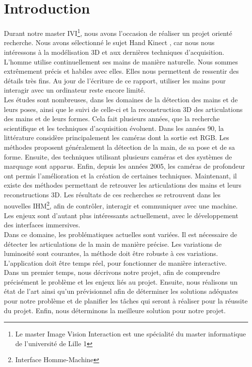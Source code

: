 \chapter*{Introduction}

Durant notre master IVI\footnote{Le master Image Vision Interaction est 
une spécialité du master informatique de l'université de Lille 1}, 
nous avons l'occasion de réaliser un projet orienté recherche. Nous avons 
sélectionné le sujet \og Hand Kinect \fg, car nous nous intéressons à la 
modélisation 3D et aux dernières techniques d'acquisition.\\

L'homme utilise continuellement ses mains de manière naturelle. Nous 
sommes extrêmement précis et habiles avec elles. Elles nous permettent 
de ressentir des détails très fins. Au jour de l'écriture de ce rapport, 
utiliser les mains pour interagir avec un ordinateur reste encore limité.\\

Les études sont nombreuses, dans les domaines de la détection des mains 
et de leurs poses, ainsi que le suivi de celle-ci et la reconstruction 
3D des articulations des mains et de leurs formes. Cela fait plusieurs 
années, que la recherche scientifique et les techniques d'acquisition 
évoluent. Dans les années 90, la littérature considère principalement les 
caméras dont la sortie est RGB. Les méthodes proposent généralement la 
détection de la main, de sa pose et de sa forme. Ensuite, des techniques 
utilisant plusieurs caméras et des systèmes de marquage sont apparus. 
Enfin, depuis les années 2005, les caméras de profondeur ont permis 
l'amélioration et la création de certaines techniques. Maintenant, il 
existe des méthodes permettant de retrouver les articulations des mains 
et leurs reconstructions 3D. Les résultats de ces recherches se 
retrouvent dans les nouvelles IHM\footnote{Interface Homme-Machine}, 
afin de contrôler, interagir et communiquer avec une machine. Les enjeux 
sont d'autant plus intéressants actuellement, avec le développement des 
interfaces immersives.\\

Dans ce domaine, les problématiques actuelles sont variées. Il est 
nécessaire de détecter les articulations de la main de manière précise. 
Les variations de luminosité sont courantes, la méthode doit être robuste 
à ces variations. L'application doit être temps réel, pour fonctionner de 
manière interactive.\\


Dans un premier temps, nous décrivons notre projet, afin de comprendre 
précisément le problème et les enjeux liés au projet. Ensuite, nous 
réalisons un état de l'art ainsi qu'un prévisionnel afin de déterminer 
les solutions adéquates pour notre problème et de planifier les tâches 
qui seront à réaliser pour la réussite du projet. Enfin, nous déterminons 
la meilleure solution pour notre projet.\\
